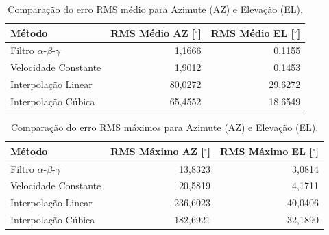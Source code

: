 \begin{table}[h!]
\centering
\caption{Comparação do erro RMS médio para Azimute (AZ) e Elevação (EL).}
\label{tab:rms_consolidado}
\begin{tabular}{@{}l r r @{}}
\toprule
\textbf{Método} & {\textbf{RMS Médio AZ [$^\circ$]}} & {\textbf{RMS Médio EL [$^\circ$]}}\\
\midrule
Filtro $\alpha$-$\beta$-$\gamma$ & 1,1666 & 0,1155 \\
Velocidade Constante & 1,9012 & 0,1453 \\
Interpolação Linear & 80,0272 & 29,6272 \\
Interpolação Cúbica & 65,4552 & 18,6549 \\
\bottomrule
\end{tabular}
\end{table}

\begin{table}[h!]
\centering
\caption{Comparação do erro RMS máximos para Azimute (AZ) e Elevação (EL).}
\label{tab:rms_max_consolidado}
\begin{tabular}{@{}l r r @{}}
\toprule
\textbf{Método} & {\textbf{RMS Máximo AZ [$^\circ$]}} & {\textbf{RMS Máximo EL [$^\circ$]}} \\
\midrule
Filtro $\alpha$-$\beta$-$\gamma$ & 13,8323 & 3,0814 \\
Velocidade Constante & 20,5819 & 4,1711 \\
Interpolação Linear & 236,6023 & 40,0406 \\
Interpolação Cúbica & 182,6921 & 32,1890\\
\bottomrule
\end{tabular}
\end{table}

